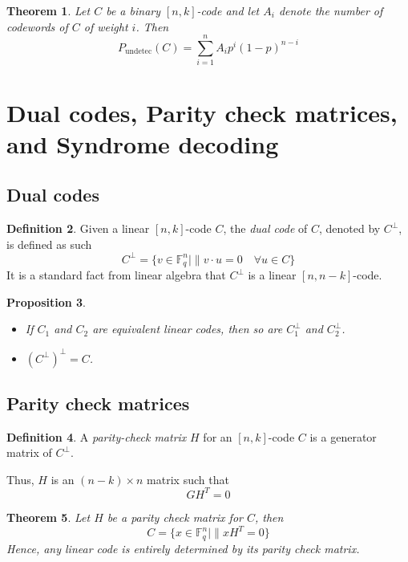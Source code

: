 \documentclass[11pt,a4paper]{article}
\theoremstyle{definition}
\newtheorem{definition}{Definition}[section]
\theoremstyle{plain}
\newtheorem{theorem}[definition]{Theorem}
\newtheorem{proposition}[definition]{Proposition}
\theoremstyle{remark}
\begin{document}
\begin{theorem}
    Let $C$ be a binary $[n,k]$-code and let $A_i$ denote the number of codewords of $C$ of weight $i$. Then 
    $$P_{\text{undetec}}(C) = \sum_{i = 1}^{n} A_i p^i (1-p)^{n-i}$$
\end{theorem}

\section{Dual codes, Parity check matrices, and Syndrome decoding}

\subsection{Dual codes} 

\begin{definition}
    Given a linear $[n,k]$-code $C$, the \emph{dual code} of $C$, denoted by $C^\perp$, is defined as such 
    $$C^\perp = \{v \in \mathbb{F}_q^n \mid \| v \cdot u = 0 \quad \forall u \in C\}$$
    It is a standard fact from linear algebra that $C^\perp$ is a 
    linear $[n, n-k]$-code. 
\end{definition}

\begin{proposition}
    \begin{itemize}
        \item If $C_1$ and $C_2$ are equivalent linear codes, then so are 
        $C_1^\perp$ and $C_2^\perp$. 
        \item $(C^\perp)^\perp = C$. 
    \end{itemize}
\end{proposition}

\subsection{Parity check matrices} 

\begin{definition}
    A \emph{parity-check matrix} $H$ for an $[n,k]$-code $C$ is a generator matrix of $C^\perp$.

    Thus, $H$ is an $(n-k) \times n$ matrix such that
    $$GH^T = 0$$
\end{definition}

\begin{theorem}
    Let $H$ be a parity check matrix for $C$, then 
    $$C = \{x \in \mathbb{F}_q^n \mid \| xH^T = 0\}$$
    Hence, any linear code is entirely determined by its parity check matrix. 
\end{theorem}
\end{document}
